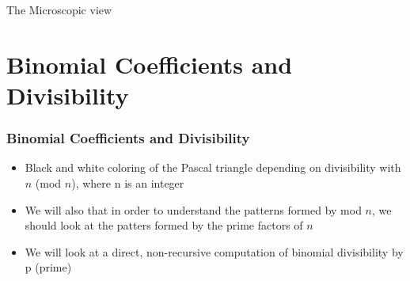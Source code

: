 \documentclass{beamer}
\begin{document}

\begin{frame}
    \centering
    \Large
    The Microscopic view 
\end{frame}

\section{Binomial Coefficients and Divisibility}

\begin{frame}
    \frametitle{Binomial Coefficients and Divisibility}
    \begin{itemize}
        \item Black and white coloring of the Pascal triangle depending on divisibility with $n$ (mod $n$), where n is an integer
        \item We will also that in order to understand the patterns formed by mod $n$, we should look at the patters formed by the prime factors of $n$ 
        \item We will look at a direct, non-recursive computation of binomial divisibility by p (prime)
    \end{itemize}
\end{frame}
\end{document}
